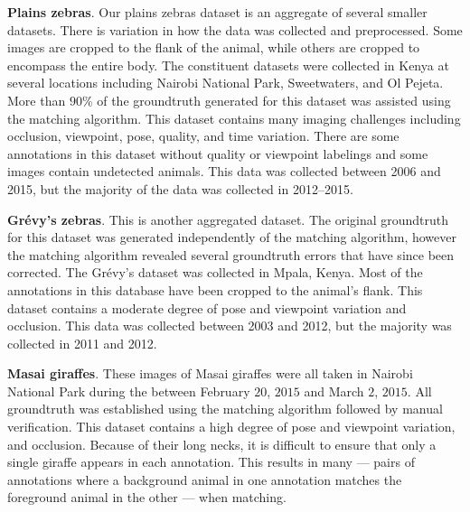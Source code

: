         \FloatBarrier{}

        \begin{itemln}
            \item \textbf{Plains zebras}.
            Our plains zebras dataset is an aggregate of several smaller datasets.
            There is variation in how the data was collected and preprocessed.
            Some images are cropped to the flank of the animal, while others are cropped to encompass the entire
              body.
            The constituent datasets were collected in Kenya at several locations including Nairobi National
              Park, Sweetwaters, and Ol Pejeta.
            More than $90\percent$ of the groundtruth generated for this dataset was assisted using the matching
              algorithm.
            This dataset contains many imaging challenges including occlusion, viewpoint, pose, quality, and time
              variation.
            There are some annotations in this dataset without quality or viewpoint labelings and some images
              contain undetected animals.
            This data was collected between 2006 and 2015, but the majority of the data was collected in
              2012--2015.

            \item \textbf{Grévy's zebras}.
            This is another aggregated dataset.
            The original groundtruth for this dataset was generated independently of the matching algorithm,
              however the matching algorithm revealed several groundtruth errors that have since been corrected.
            The Grévy's dataset was collected in Mpala, Kenya.
            Most of the annotations in this database have been cropped to the animal's flank.
            This dataset contains a moderate degree of pose and viewpoint variation and occlusion.
            This data was collected between 2003 and 2012, but the majority was collected in 2011 and 2012.

            \item \textbf{Masai giraffes}.
            These images of Masai giraffes were all taken in Nairobi National Park during the \GZC{} between
              February $20$, $2015$ and March $2$, $2015$.
            All groundtruth was established using the matching algorithm followed by manual verification.
            This dataset contains a high degree of pose and viewpoint variation, and occlusion.
            Because of their long necks, it is difficult to ensure that only a single giraffe appears in each
              annotation.
            This results in many  --- pairs of annotations where a background animal in one
              annotation matches the foreground animal in the other --- when matching.


\end{itemln}
